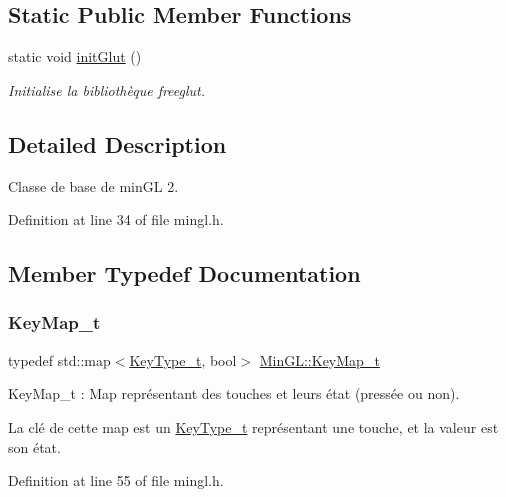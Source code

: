 \subsection*{Static Public Member Functions}
\begin{DoxyCompactItemize}
\item 
static void \hyperlink{class_min_g_l_a17c7718b9e966c8147cd56483dcf4e8d}{init\+Glut} ()
\begin{DoxyCompactList}\small\item\em Initialise la bibliothèque freeglut. \end{DoxyCompactList}\end{DoxyCompactItemize}


\subsection{Detailed Description}
Classe de base de min\+GL 2. 

Definition at line 34 of file mingl.\+h.



\subsection{Member Typedef Documentation}
\mbox{\label{class_min_g_l_a084b1a739a671ad7d6af07792bd56af1}} 
\subsubsection{\texorpdfstring{Key\+Map\+\_\+t}{KeyMap\_t}}
{\footnotesize\ttfamily typedef std\+::map$<$\hyperlink{class_min_g_l_a6e612d21ed9723c37ad91093f7b48c96}{Key\+Type\+\_\+t}, bool$>$ \hyperlink{class_min_g_l_a084b1a739a671ad7d6af07792bd56af1}{Min\+G\+L\+::\+Key\+Map\+\_\+t}}



Key\+Map\+\_\+t \+: Map représentant des touches et leurs état (pressée ou non). 

La clé de cette map est un \hyperlink{class_min_g_l_a6e612d21ed9723c37ad91093f7b48c96}{Key\+Type\+\_\+t} représentant une touche, et la valeur est son état. 

Definition at line 55 of file mingl.\+h.

\mbox{\label{class_min_g_l_a6e612d21ed9723c37ad91093f7b48c96}} 
